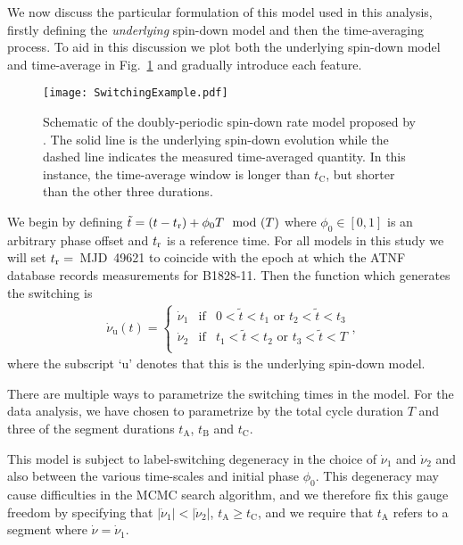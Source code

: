 \documentclass[../full_thesis/full_thesis.tex]{subfiles}
\newcommand{\nudotOne}{\dot{\nu}_{1}}
\newcommand{\nudotTwo}{\dot{\nu}_{2}}
\newcommand{\tI}[1]{t_{\mathrm{#1}}}
\begin{document}
We now discuss the particular formulation of this model used in this
analysis, firstly defining the \emph{underlying} spin-down model and then the
time-averaging process. To aid in this discussion we plot both the underlying
spin-down model and time-average in Fig.~\ref{fig: perera illustration} and
gradually introduce each feature.
\begin{figure}
\centering \texttt{[image: SwitchingExample.pdf]}
\caption{Schematic of the doubly-periodic spin-down rate model proposed by
\citet{Perera2015}. The solid line is the underlying spin-down evolution while
the dashed line indicates the measured time-averaged quantity. In this
instance, the time-average window is longer than $\tI{C}$, but shorter than the
other three durations.}
\label{fig: perera illustration}
\end{figure}

We begin by defining $\tilde{t} = (t-t_{\textrm{r}}) + \phi_{0}T\mod(T)$ where $\phi_0 \in [0,
1]$ is an arbitrary phase offset and $t_{\textrm{r}}$ is a reference time. For all models
in this study we will set $t_{\textrm{r}}=$~MJD~49621 to coincide with the epoch at which
the ATNF database \citet{Manchester1977} records measurements for B1828-11.
Then the function which generates the switching is
\begin{align}
\dot{\nu}_{\mathrm{u}}(t) = \left\{
    \begin{array}{ccc}
    \nudotOne & \mathrm{if} & 0 < \tilde{t} < t_{1}
    \textrm{ or } t_{2} < \tilde{t} < t_{3} \\
    \nudotTwo & \mathrm{if} & t_{1} < \tilde{t} < t_{2}
    \textrm{ or } t_{3} < \tilde{t} < T\\
    \end{array}
    \right. ,
\end{align}
where the subscript `u' denotes that this is the underlying spin-down model.

There are multiple ways to parametrize the switching times in the model. For
the data analysis, we have chosen to parametrize by the total cycle duration
$T$ and three of the segment durations $\tI{A}$, $\tI{B}$ and $\tI{C}$.

This model is subject to label-switching degeneracy in the choice of
$\nudotOne$ and $\nudotTwo$ and also between the various time-scales and
initial phase $\phi_0$.  This degeneracy may cause difficulties in the MCMC
search algorithm, and we therefore fix this gauge freedom by specifying that
$|\nudotOne| < |\nudotTwo|$, $\tI{A} \ge \tI{C}$, and we require that $\tI{A}$
refers to a segment where $\dot{\nu} = \nudotOne$.
\end{document}
